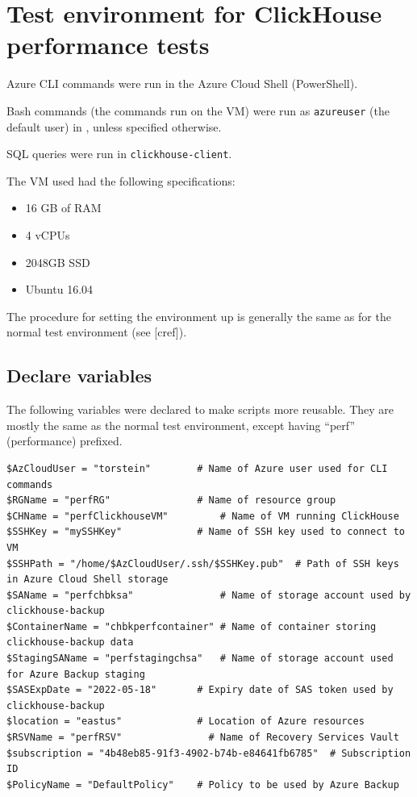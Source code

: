 \section{Test environment for ClickHouse performance tests}
\label{app:ch-perf}
Azure CLI commands were run in the Azure Cloud Shell (PowerShell).

Bash commands (the commands run on the VM) were run as \texttt{azureuser}
(the default user) in , unless specified otherwise.

SQL queries were run in \texttt{clickhouse-client}.

The VM used had the following specifications:
\begin{itemize}
\item 16 GB of RAM
\item 4 vCPUs
\item 2048GB SSD
\item Ubuntu 16.04
\end{itemize}

The procedure for setting the environment up is generally the same as for the normal test environment
(see [cref]).

\subsection{Declare variables}
\label{sec:org306c306}
The following variables were declared to make scripts more reusable.
They are mostly the same as the normal test environment,
except having ``perf'' (performance) prefixed.

\begin{verbatim}
$AzCloudUser = "torstein"        # Name of Azure user used for CLI commands
$RGName = "perfRG"               # Name of resource group
$CHName = "perfClickhouseVM"         # Name of VM running ClickHouse
$SSHKey = "mySSHKey"             # Name of SSH key used to connect to VM
$SSHPath = "/home/$AzCloudUser/.ssh/$SSHKey.pub"  # Path of SSH keys in Azure Cloud Shell storage
$SAName = "perfchbksa"               # Name of storage account used by clickhouse-backup
$ContainerName = "chbkperfcontainer" # Name of container storing clickhouse-backup data
$StagingSAName = "perfstagingchsa"   # Name of storage account used for Azure Backup staging
$SASExpDate = "2022-05-18"       # Expiry date of SAS token used by clickhouse-backup
$location = "eastus"             # Location of Azure resources
$RSVName = "perfRSV"               # Name of Recovery Services Vault
$subscription = "4b48eb85-91f3-4902-b74b-e84641fb6785"  # Subscription ID
$PolicyName = "DefaultPolicy"    # Policy to be used by Azure Backup
\end{verbatim}
